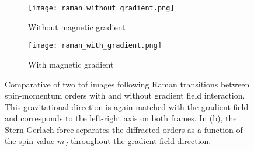 \begin{figure}[!htbp]
	\centering
	\begin{subfigure}{.5\textwidth}
		\centering
		\texttt{[image: raman\_without\_gradient.png]}
		\caption{Without magnetic gradient}
		\label{fig:raman_without_gradient}
	\end{subfigure}%
	\begin{subfigure}{.5\textwidth}
		\centering
		\texttt{[image: raman\_with\_gradient.png]}
		\caption{With magnetic gradient}
		\label{fig:raman_with_gradient}
	\end{subfigure}
	\caption[Comparative of two \ac{tof} images following Raman transitions between spin-momentum orders with and without gradient field interaction]{Comparative of two \ac{tof} images following Raman transitions between spin-momentum orders with and without gradient field interaction. This gravitational direction is again matched with the gradient field and corresponds to the left-right axis on both frames. In (b), the Stern-Gerlach force separates the diffracted orders as a function of the spin value $m_J$ throughout the gradient field direction.  }
	\label{fig:raman_gradient}
\end{figure}

